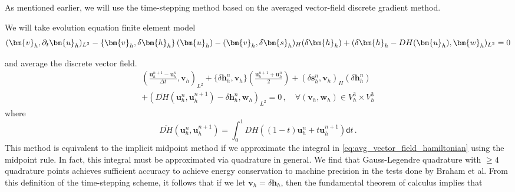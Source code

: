 As mentioned earlier, we will use the time-stepping method based on the averaged vector-field discrete gradient method.

We will take evolution equation finite element model
\begin{equation} \label{eq:evolution_eqns_fem_model}
    (\bm{v}_h, \partial_t \bm{u}_h)_{L^2}
    -
    \{ \bm{v}_h, \delta \bm{h}_h \} \left( \bm{u}_h \right)
    -
    ( \bm{v}_h, \delta \bm{s}_h)_H ( \delta \bm{h}_h ) \\
    +
    (\delta \bm{h}_h - DH(\bm{u}_h), \bm{w}_h)_{L^2}
    =
    0
\end{equation}

and average the discrete vector field.
\begin{multline}
    \left(\frac{\bm{u}_h^{n+1} - \bm{u}_h^n}{\Delta t}, \bm{v}_h \right)_{L^2}
    +
    \{ \delta \bm{h}_h^n, \bm{v}_h \} \left( \frac{\bm{u}_h^{n+1} + \bm{u}_h^n}{2} \right)
    +
    ( \delta \bm{s}_h^n, \bm{v}_h)_H ( \delta \bm{h}_h^n ) \\
    +
    ( \overline{DH}(\bm{u}_h^{n}, \bm{u}_h^{n+1}) - \delta \bm{h}_h^n, \bm{w}_h)_{L^2}
    =
    0 \,, \quad \forall (\bm{v}_h, \bm{w}_h) \in V_h^3 \times V_h^3
\end{multline}
where
\begin{equation} \label{eq:avg_vector_field_hamiltonian}
    \overline{DH}(\bm{u}_h^{n}, \bm{u}_h^{n+1})
    =
    \int_0^1 DH( (1-t) \bm{u}_h^n + t \bm{u}_h^{n+1}) \mathsf{d} t \,.
\end{equation}
This method is equivalent to the implicit midpoint method if we approximate the integral in \eqref{eq:avg_vector_field_hamiltonian} using the midpoint rule. In fact, this integral must be approximated via quadrature in general. We find that Gauss-Legendre quadrature with $\geq 4$ quadrature points achieves sufficient accuracy to achieve energy conservation to machine precision in the tests done by Braham et al. From this definition of the time-stepping scheme, it follows that if we let $\bm{v}_h = \delta \bm{h}_h$, then the fundamental theorem of calculus implies that


